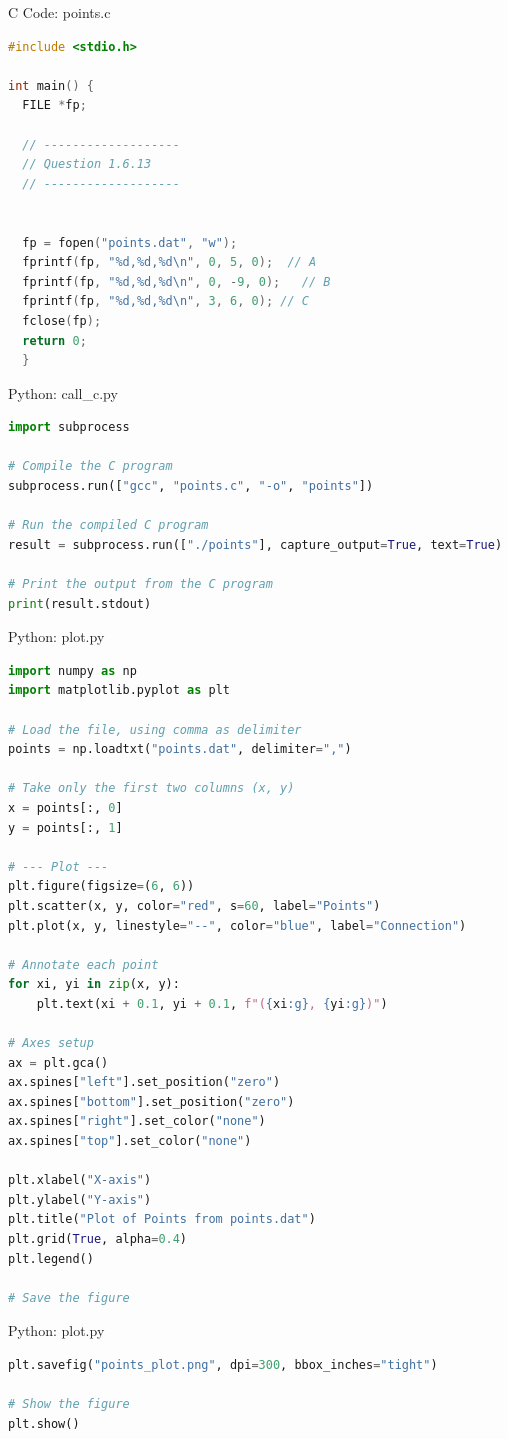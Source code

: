 \documentclass{beamer}
\numberwithin{equation}{section}
\theoremstyle{remark}
\begin{document}
\begin{frame}[fragile]{C Code: points.c}
\begin{lstlisting}[language=C]
#include <stdio.h>

int main() {
  FILE *fp;

  // -------------------
  // Question 1.6.13
  // -------------------


  fp = fopen("points.dat", "w");
  fprintf(fp, "%d,%d,%d\n", 0, 5, 0);  // A
  fprintf(fp, "%d,%d,%d\n", 0, -9, 0);   // B
  fprintf(fp, "%d,%d,%d\n", 3, 6, 0); // C
  fclose(fp);
  return 0;
  }
\end{lstlisting}
\end{frame}

\begin{frame}[fragile]{Python: call\_c.py}
\begin{lstlisting}[language=Python]
import subprocess

# Compile the C program
subprocess.run(["gcc", "points.c", "-o", "points"])

# Run the compiled C program
result = subprocess.run(["./points"], capture_output=True, text=True)

# Print the output from the C program
print(result.stdout)
\end{lstlisting}
\end{frame}

\begin{frame}[fragile]{Python: plot.py}
\begin{lstlisting}[language=Python]
import numpy as np
import matplotlib.pyplot as plt

# Load the file, using comma as delimiter
points = np.loadtxt("points.dat", delimiter=",")

# Take only the first two columns (x, y)
x = points[:, 0]
y = points[:, 1]

# --- Plot ---
plt.figure(figsize=(6, 6))
plt.scatter(x, y, color="red", s=60, label="Points")
plt.plot(x, y, linestyle="--", color="blue", label="Connection")

# Annotate each point
for xi, yi in zip(x, y):
    plt.text(xi + 0.1, yi + 0.1, f"({xi:g}, {yi:g})")

# Axes setup
ax = plt.gca()
ax.spines["left"].set_position("zero")
ax.spines["bottom"].set_position("zero")
ax.spines["right"].set_color("none")
ax.spines["top"].set_color("none")

plt.xlabel("X-axis")
plt.ylabel("Y-axis")
plt.title("Plot of Points from points.dat")
plt.grid(True, alpha=0.4)
plt.legend()

# Save the figure
\end{lstlisting}
\end{frame}
\begin{frame}[fragile]{Python: plot.py }
\begin{lstlisting}[language=Python]
plt.savefig("points_plot.png", dpi=300, bbox_inches="tight")

# Show the figure
plt.show()
\end{lstlisting}
\end{frame}
\end{document}
